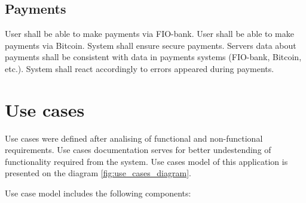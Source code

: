 \subsection*{Payments}
\begin{itemize}
User shall be able to make payments via FIO-bank.
User shall be able to make payments via Bitcoin.
System shall ensure secure payments.
Servers data about payments shall be consistent with data in payments systems (FIO-bank, Bitcoin, etc.).
System shall react accordingly to errors appeared during payments.
\end{itemize}



\newcommand{\uccomponent}[1]{
\item \textbf{#1}
}
\newcommand{\ucactor}[1]{
\item \textbf{#1}
}
\newcommand{\ucgroup}[1]{
\item \textbf{#1}
}
\section{Use cases}
Use cases were defined after analising of functional and non-functional requirements. Use cases documentation serves for
better undestending of functionality required from the system. Use cases model of this application is presented on the
diagram \ref{fig:use_cases_diagram}.


Use case model includes the following components:


